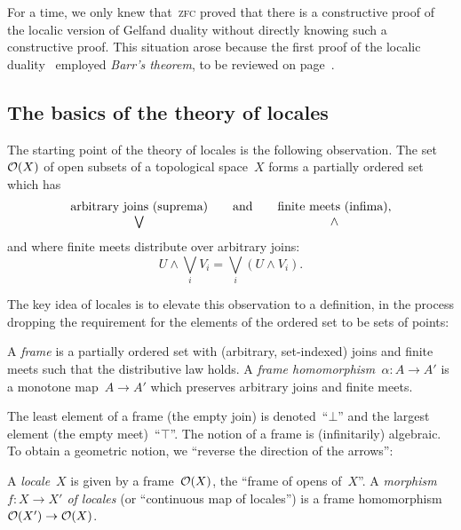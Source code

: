 \documentclass{ws-rv9x6}
\begin{document}
{\begin{remark}For a time, we only knew that~\textsc{zfc} proved that there is a
constructive proof of the localic version of Gelfand duality without directly
knowing such a constructive proof. This situation arose because the first proof
of the localic duality~\cite{banaschewski-mulvey:gelfand} employed \emph{Barr's
theorem}, to be reviewed on page~\pageref{par:barr}.\end{remark}


\subsection{The basics of the theory of locales}

The starting point of the theory of locales is the following
observation. The set~$\mathcal{O}(X)$ of open subsets of a topological
space~$X$ forms a partially ordered set which has
\[ \begin{array}{@{}ccc@{}}
\text{arbitrary joins (suprema)}
&\quad\text{and}\quad&
\text{finite meets (infima)}, \\
\bigvee && \wedge
\end{array} \]
and where finite meets distribute over arbitrary joins:
\[ U \wedge \bigvee_i V_i = \bigvee_i (U \wedge V_i). \]

The key idea of locales is to elevate this observation to a definition, in the
process dropping the requirement for the elements of the ordered set to be sets
of points:
\begin{definition}A \emph{frame} is a partially ordered set with (arbitrary,
set-indexed) joins and finite meets such that the distributive law
holds. A \emph{frame homomorphism~$\alpha : A \to A'$} is a monotone map~$A
\to A'$ which preserves arbitrary joins and finite meets.\end{definition}

The least element of a frame (the empty join) is denoted~``$\bot$'' and the
largest element (the empty meet)~``$\top$''. The notion of a frame is
(infinitarily) algebraic. To obtain a geometric notion, we ``reverse the
direction of the arrows'':

\begin{definition}\label{defn:locale}
A \emph{locale}~$X$ is given by a frame~$\mathcal{O}(X)$, the ``frame
of opens of~$X$''. A \emph{morphism~$f : X \to X'$ of locales} (or ``continuous
map of locales'') is a frame homomorphism~$\mathcal{O}(X') \to \mathcal{O}(X)$.\end{definition}

}
\end{document}
